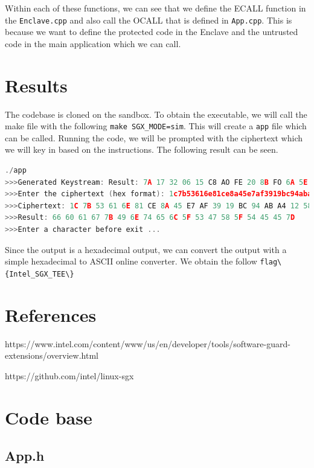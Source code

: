 \documentclass{article}
\newcommand{\code}[1]{\lstinline|#1|}
\begin{document}
Within each of these functions, we can see that we define the ECALL function in
the \code{Enclave.cpp} and also call the OCALL that is defined in \code{App.cpp}.
This is because we want to define the protected code in the Enclave and the untrusted
code in the main application which we can call.

\section*{Results}

The codebase is cloned on the sandbox. To obtain the executable, we will call
the make file with the following \code{make SGX_MODE=sim}. This will create a
\code{app} file which can be called. Running the code, we will be prompted with
the ciphertext which we will key in based on the instructions. The following
result can be seen.

\begin{lstlisting}[language=c++]
./app
>>>Generated Keystream: Result: 7A 17 32 06 15 C8 AO FE 20 8B FO 6A 5E E4 CB FF E1 57 25
>>>Enter the ciphertext (hex format): 1c7b53616e81ce8a45e7af3919bc94aba41258
>>>Ciphertext: 1C 7B 53 61 6E 81 CE 8A 45 E7 AF 39 19 BC 94 AB A4 12 58
>>>Result: 66 60 61 67 7B 49 6E 74 65 6C 5F 53 47 58 5F 54 45 45 7D
>>>Enter a character before exit ...
\end{lstlisting}

Since the output is a hexadecimal output, we can convert the output with a
simple hexadecimal to ASCII online converter. We obtain the follow
\code{flag\{Intel_SGX_TEE\}}

\section*{References}

https://www.intel.com/content/www/us/en/developer/tools/software-guard-extensions/overview.html

https://github.com/intel/linux-sgx

\section*{Code base}

\subsection*{App.h}
\end{document}
